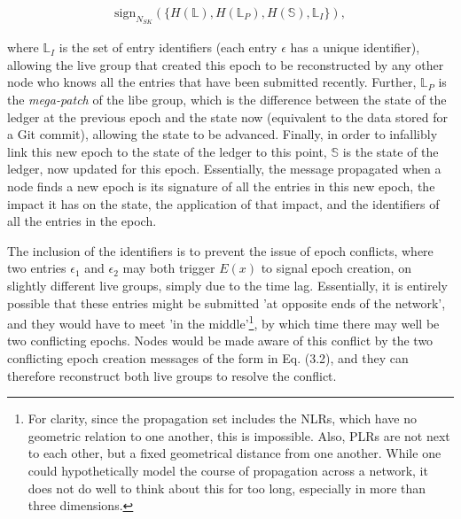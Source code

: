 \documentclass{extreport}
\begin{document}
\begin{align*}
\mathrm{sign}_{N_{SK}}(\{ H(\mathbb{L}), H(\mathbb{L}_P), H(\mathbb{S}), \mathbb{L}_I \}), \tag{3.2}
\end{align*}

where \(\mathbb{L}_I\) is the set of entry identifiers (each entry \(\epsilon\) has a unique identifier), allowing the live group that created this epoch to be reconstructed by any other node who knows all the entries that have been submitted recently. Further, \(\mathbb{L}_P\) is the \emph{mega-patch} of the libe group, which is the difference between the state of the ledger at the previous epoch and the state now (equivalent to the data stored for a Git commit), allowing the state to be advanced. Finally, in order to infallibly link this new epoch to the state of the ledger to this point, \(\mathbb{S}\) is the state of the ledger, now updated for this epoch. Essentially, the message propagated when a node finds a new epoch is its signature of all the entries in this new epoch, the impact it has on the state, the application of that impact, and the identifiers of all the entries in the epoch.

The inclusion of the identifiers is to prevent the issue of epoch conflicts, where two entries \(\epsilon_1\) and \(\epsilon_2\) may both trigger \(E(x)\) to signal epoch creation, on slightly different live groups, simply due to the time lag. Essentially, it is entirely possible that these entries might be submitted 'at opposite ends of the network', and they would have to meet 'in the middle'\footnote{For clarity, since the propagation set includes the NLRs, which have no geometric relation to one another, this is impossible. Also, PLRs are not next to each other, but a fixed geometrical distance from one another. While one could hypothetically model the course of propagation across a network, it does not do well to think about this for too long, especially in more than three dimensions.}, by which time there may well be two conflicting epochs. Nodes would be made aware of this conflict by the two conflicting epoch creation messages of the form in Eq. (3.2), and they can therefore reconstruct both live groups to resolve the conflict.
\end{document}
